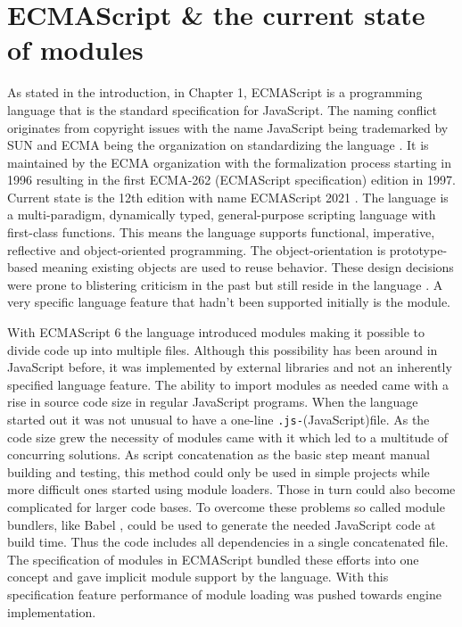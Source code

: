 \section{ECMAScript \& the current state of modules}
As stated in the introduction, in Chapter 1, ECMAScript is a programming language that is the standard specification for JavaScript. The naming conflict originates from copyright issues with the name JavaScript being trademarked by SUN and ECMA being the organization on standardizing the language \cite{10.1145/3386327}. It is maintained by the ECMA organization with the formalization process starting in 1996 resulting in the first ECMA-262 (ECMAScript specification) edition in 1997. Current state is the 12th edition with name ECMAScript 2021 \cite{ecma}. The language is a multi-paradigm, dynamically typed, general-purpose scripting language with first-class functions. This means the language supports functional, imperative, reflective and object-oriented programming. The object-orientation is prototype-based meaning existing objects are used to reuse behavior. These design decisions were prone to blistering criticism in the past but still reside in the language \cite{10.1145/3386327}. A very specific language feature that hadn't been supported initially is the module.

With ECMAScript 6 the language introduced modules making it possible to divide code up into multiple files. Although this possibility has been around in JavaScript before, it was implemented by external libraries and not an inherently specified language feature. The ability to import modules as needed came with a rise in source code size in regular JavaScript programs. When the language started out it was not unusual to have a one-line \texttt{.js-}(JavaScript)file. As the code size grew the necessity of modules came with it which led to a multitude of concurring solutions. As script concatenation as the basic step meant manual building and testing, this method could only be used in simple projects while more difficult ones started using module loaders. Those in turn could also become complicated for larger code bases. To overcome these problems so called module bundlers, like Babel \cite{babel}, could be used to generate the needed JavaScript code at build time. Thus the code includes all dependencies in a single concatenated file. The specification of modules in ECMAScript bundled these efforts into one concept and gave implicit module support by the language. With this specification feature performance of module loading was pushed towards engine implementation.

